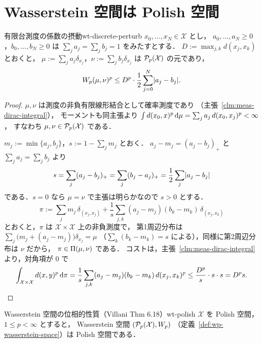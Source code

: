 \section{Wasserstein 空間は Polish 空間}
\label{sec:wt-polish}

\begin{lemma}{有限台測度の係数の摂動}{wt-discrete-perturb}
  $x_0,\dots,x_N\in\mathcal{X}$ とし，
  $a_0,\dots,a_N\geq0$，$b_0,\dots,b_N\geq0$ は
  $\sum_ja_j=\sum_jb_j=1$ をみたすとする．
  $D:=\max_{j,k}d(x_j,x_k)$ とおくと，
  $\mu:=\sum_ja_j\delta_{x_j}$，$\nu:=\sum_jb_j\delta_{x_j}$ は
  $\mathcal{P}_{p}(\mathcal{X})$ の元であり，
  \[
    W_p(\mu,\nu)^p
    \leq D^p\cdot\frac12\sum_{j=0}^N\lvert a_j-b_j \rvert.
  \]
\end{lemma}

\begin{proof}
  $\mu,\nu$ は測度の非負有限線形結合として確率測度であり
  （主張~\ref{clm:meas-dirac-integral}），
  モーメントも同主張より
  $\int d(x_0,x)^p\,\mathrm{d}\mu=\sum_ja_j\,d(x_0,x_j)^p<\infty$，
  すなわち $\mu,\nu\in\mathcal{P}_{p}(\mathcal{X})$ である．

  $m_j:=\min\{a_j,b_j\}$，$s:=1-\sum_jm_j$ とおく．
  $a_j-m_j=(a_j-b_j)_+$ と $\sum_ja_j=\sum_jb_j$ より
  \[
    s=\sum_j(a_j-b_j)_+
    =\sum_j(b_j-a_j)_+
    =\frac12\sum_j\lvert a_j-b_j \rvert
  \]
  である．$s=0$ なら $\mu=\nu$ で主張は明らかなので $s>0$ とする．
  \[
    \pi:=\sum_jm_j\,\delta_{(x_j,x_j)}
    +\frac1s\sum_{j,k}(a_j-m_j)(b_k-m_k)\,\delta_{(x_j,x_k)}
  \]
  とおくと，$\pi$ は $\mathcal{X}\times\mathcal{X}$ 上の非負測度で，
  第1周辺分布は
  $\sum_j\bigl(m_j+(a_j-m_j)\bigr)\delta_{x_j}=\mu$
  （$\sum_k(b_k-m_k)=s$ による），同様に第2周辺分布は $\nu$ だから，
  $\pi\in\Pi(\mu,\nu)$ である．
  コストは，主張~\ref{clm:meas-dirac-integral}より，対角項が $0$ で
  \[
    \int_{\mathcal{X}\times\mathcal{X}}d(x,y)^p\,\mathrm{d}\pi
    =\frac1s\sum_{j,k}(a_j-m_j)(b_k-m_k)\,d(x_j,x_k)^p
    \leq\frac{D^p}{s}\cdot s\cdot s
    =D^p s.  \qedhere
  \]
\end{proof}

\begin{theorem}{Wasserstein 空間の位相的性質（Villani Thm 6.18）}{wt-polish}
  $\mathcal{X}$ を Polish 空間，$1\leq p<\infty$ とすると，
  Wasserstein 空間 $(\mathcal{P}_{p}(\mathcal{X}),W_p)$
  （定義~\ref{def:wp-wasserstein-space}）は Polish 空間である．
\end{theorem}


